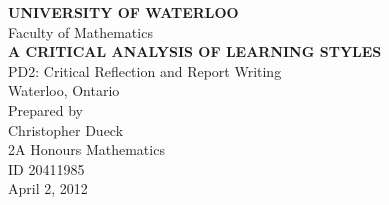 \documentclass[12pt]{report}
\begin{document}
\begin{titlepage}
    \begin{center}
        \textbf{UNIVERSITY OF WATERLOO}\\
        Faculty of Mathematics\\
        \vspace{2.0in}
        \textbf{A CRITICAL ANALYSIS OF LEARNING STYLES}\\
        \vspace{2.0in}
        PD2: Critical Reflection and Report Writing\\
        Waterloo, Ontario\\
        \vspace{2.0in}
        Prepared by\\
        Christopher Dueck\\
        2A Honours Mathematics\\
        ID 20411985\\
        April 2, 2012\\
    \end{center}
\end{titlepage}
\end{document}

